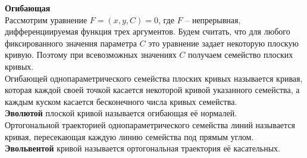 \documentclass{report}
\begin{document}
\noindent
\textbf{Огибающая}\\
Рассмотрим уравнение $F = (x, y, C) = 0$, где $F$ -- непрерывная, дифференциируемая функция
трех аргументов. Будем считать, что для любого фиксированного значения параметра $C$ это 
уравнение задает некоторую плоскую кривую. Поэтому при всевозможных значениях $C$ получаем
семейство плоских кривых.\\
Огибающей однопараметрического семейства плоских кривых называется кривая, которая каждой
своей точкой касается некоторой кривой указанного семейства, а каждым куском касается 
бесконечного числа кривых семейства.\\
\textbf{Эволютой} плоской кривой называется огибающая её нормалей.\\
Ортогональной траекторией однопараметрического семейства линий называется кривая,
пересекающая каждую линию семейства под прямым углом.\\
\textbf{Эвольвентой} кривой называется ортогональная траектория её касательных.\\
\end{document}
